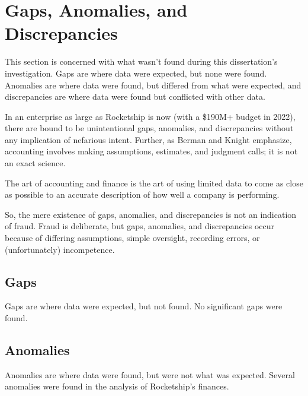 \section{Gaps,  Anomalies, and Discrepancies}%
\label{sec:gaps_anomolies_discrepencies}\indent%

This section is concerned with what wasn't found during this dissertation's investigation. Gaps are where data were expected, but none were found. Anomalies are where data were found, but differed from what were expected, and discrepancies are where data were found but conflicted with other data.

In an enterprise as large as Rocketship is now (with a \$190M+ budget in 2022), there are bound to be unintentional gaps, anomalies, and discrepancies without any implication of nefarious intent. Further, as Berman and Knight emphasize, accounting involves making assumptions, estimates, and judgment calls; it is not an exact science.
\begin{displayquote}%
The art of accounting and finance is the art of using limited data to come as close as possible to an accurate description of how well a company is performing.
\end{displayquote}

So, the mere existence of gaps, anomalies, and discrepancies is not an indication of fraud. Fraud is deliberate, but gaps, anomalies, and discrepancies occur because of differing assumptions, simple oversight, recording errors, or (unfortunately)  incompetence.

\subsection{Gaps}%
\label{sec:gaps}\indent%

Gaps are where data were expected, but not found. No significant gaps were found.

\subsection{Anomalies}%
\label{sec:anomalies}\indent%

Anomalies are where data were found, but were not what was expected. Several anomalies were found in the analysis of Rocketship's finances.

